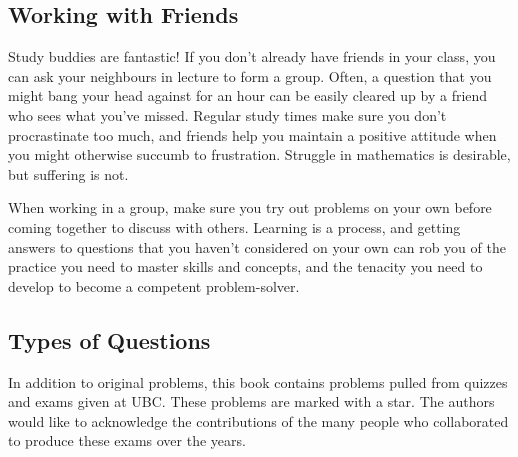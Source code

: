 \subsection*{Working with Friends}

Study buddies are fantastic! If you don't already have friends in your class, you can ask your neighbours in lecture to form a group. Often, a question that you might bang your head against for an hour can be easily cleared up by a friend who sees what you've missed. Regular study times make sure you don't procrastinate too much, and friends help you maintain a positive attitude when you might otherwise succumb to frustration. Struggle in mathematics is desirable, but suffering is not.

When working in a group, make sure you try out problems on your own before coming together to discuss with others. Learning is a process, and getting answers to questions that you haven't considered on your own can rob you of the practice you need to master skills and concepts, and the tenacity you need to develop to become a competent problem-solver.

\subsection*{Types of Questions}
%

\begin{question}[year]
In addition to original problems, this book contains problems pulled from quizzes and exams given at UBC. These problems are marked with a star. The authors would like to acknowledge the contributions of the many people who collaborated to produce these exams over the years.
\end{question}


